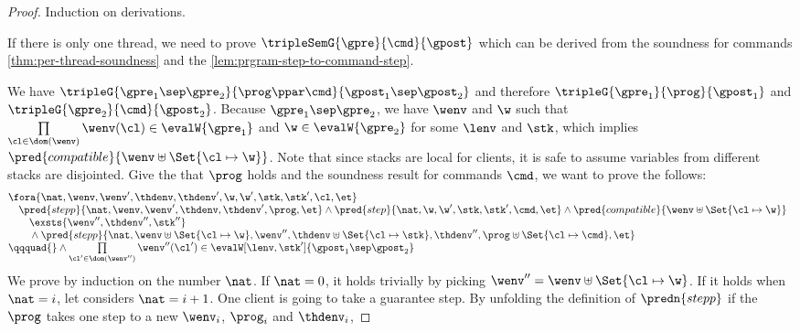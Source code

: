 \begin{proof}
Induction on derivations.

\caseB{\( \dom(\prog) \equiv \Set{\txid \mapsto \cmd} \)}
 
If there is only one thread, we need to prove \( \tripleSemG{\gpre}{\cmd}{\gpost}\) which can be derived from the soundness for commands \cref{thm:per-thread-soundness} and the \cref{lem:prgram-step-to-command-step}.

\caseI{\( \prog \ppar \cmd \)}

We have \( \tripleG{\gpre_{1} \sep \gpre_{2}}{\prog \ppar \cmd}{ \gpost_{1} \sep \gpost_{2} } \) and therefore \( \tripleG{\gpre_{1}}{\prog}{ \gpost_{1} } \) and \( \tripleG{\gpre_{2}}{\cmd}{ \gpost_{2} } \).
Because \( \gpre_{1} \sep \gpre_{2} \), we have \( \wenv\) and \( \w \) such that \( \prod\limits_{\cl \in \dom(\wenv)} \wenv(\cl) \in \evalW{\gpre_{1}} \) and \( \w \in \evalW{\gpre_{2}}\) for some \( \lenv\) and \( \stk \), which implies \( \pred{compatible}{\wenv \uplus \Set{\cl \mapsto \w}}\).
Note that since stacks are local for clients, it is safe to assume variables from different stacks are disjointed.
Give the \ih that \( \prog \) holds and the soundness result for commands \( \cmd \), we want to prove the follows:
\[
\begin{array}{@{}l}
    \fora{\nat, \wenv, \wenv', \thdenv, \thdenv', \w, \w', \stk, \stk', \cl, \et}  \\
    \quad \pred{stepp}{\nat, \wenv, \wenv', \thdenv, \thdenv', \prog, \et} 
    \land \pred{step}{\nat, \w, \w', \stk, \stk', \cmd, \et} 
    \land \pred{compatible}{\wenv \uplus \Set{\cl \mapsto \w}} \\
    \qquad \exsts{\wenv'', \thdenv'', \stk'' } \\
    \qquad {} \land \pred{stepp}{\nat, \wenv \uplus \Set{\cl \mapsto \w}, \wenv'', \thdenv \uplus \Set{\cl \mapsto \stk}, \thdenv'', \prog \uplus \Set{\cl \mapsto \cmd}, \et}  \\
    \qqquad {} \land \prod\limits_{\cl' \in \dom(\wenv'') } \wenv''(\cl')  \in \evalW[\lenv, \stk']{\gpost_{1} \sep \gpost_{2}}
\end{array}
\]
We prove by induction on the number \( \nat \).
If \( \nat = 0\), it holds trivially by picking \( \wenv'' = \wenv \uplus \Set{\cl \mapsto \w} \).
If it holds when \( \nat = i\), let considers \( \nat = i + 1\).
One client is going to take a guarantee step.
By unfolding the definition of \( \predn{stepp} \) if the \( \prog \) takes one step to a new \( \wenv_i\), \( \prog_i \) and \( \thdenv_i \),

\end{proof}
